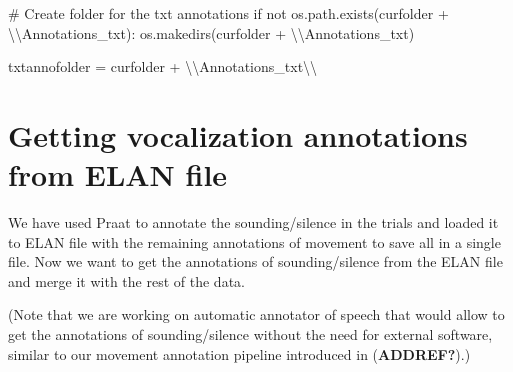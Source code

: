 \documentclass[
  letterpaper,
  DIV=11,
  numbers=noendperiod]{scrreprt}
\newenvironment{Shaded}{\begin{snugshade}}{\end{snugshade}}
\newcommand{\CharTok}[1]{\textcolor[rgb]{0.13,0.47,0.30}{#1}}
\newcommand{\CommentTok}[1]{\textcolor[rgb]{0.37,0.37,0.37}{#1}}
\newcommand{\ControlFlowTok}[1]{\textcolor[rgb]{0.00,0.23,0.31}{#1}}
\newcommand{\KeywordTok}[1]{\textcolor[rgb]{0.00,0.23,0.31}{#1}}
\newcommand{\NormalTok}[1]{\textcolor[rgb]{0.00,0.23,0.31}{#1}}
\newcommand{\OperatorTok}[1]{\textcolor[rgb]{0.37,0.37,0.37}{#1}}
\newcommand{\StringTok}[1]{\textcolor[rgb]{0.13,0.47,0.30}{#1}}
\begin{document}
\begin{Shaded}
\begin{Highlighting}[]
\CommentTok{\# Create folder for the txt annotations}
\ControlFlowTok{if} \KeywordTok{not}\NormalTok{ os.path.exists(curfolder }\OperatorTok{+} \StringTok{\textquotesingle{}}\CharTok{\textbackslash{}\textbackslash{}}\StringTok{Annotations\_txt\textquotesingle{}}\NormalTok{):}
\NormalTok{    os.makedirs(curfolder }\OperatorTok{+} \StringTok{\textquotesingle{}}\CharTok{\textbackslash{}\textbackslash{}}\StringTok{Annotations\_txt\textquotesingle{}}\NormalTok{)}

\NormalTok{txtannofolder }\OperatorTok{=}\NormalTok{ curfolder }\OperatorTok{+} \StringTok{\textquotesingle{}}\CharTok{\textbackslash{}\textbackslash{}}\StringTok{Annotations\_txt}\CharTok{\textbackslash{}\textbackslash{}}\StringTok{\textquotesingle{}}
\end{Highlighting}
\end{Shaded}


\chapter{Getting vocalization annotations from ELAN
file}\label{getting-vocalization-annotations-from-elan-file}

We have used Praat to annotate the sounding/silence in the trials and
loaded it to ELAN file with the remaining annotations of movement to
save all in a single file. Now we want to get the annotations of
sounding/silence from the ELAN file and merge it with the rest of the
data.

(Note that we are working on automatic annotator of speech that would
allow to get the annotations of sounding/silence without the need for
external software, similar to our movement annotation pipeline
introduced in (\textbf{ADDREF?}).)
\end{document}
